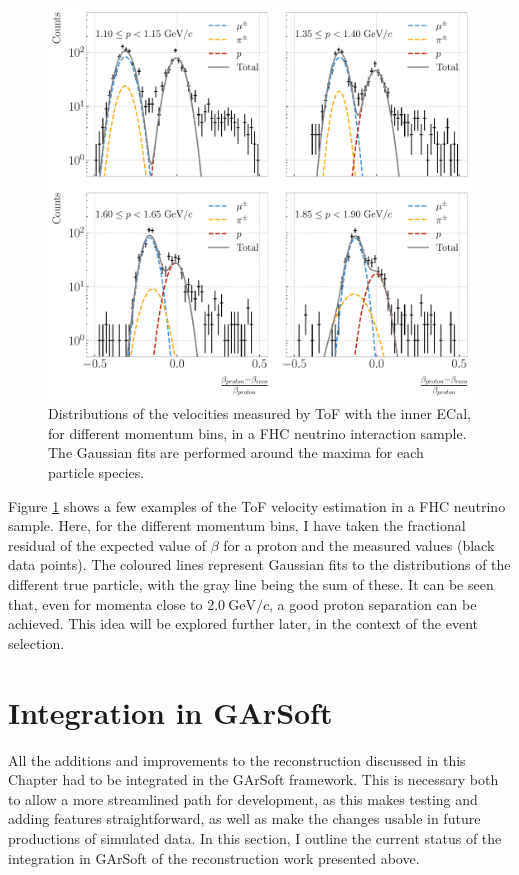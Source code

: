 \begin{figure}[t]
	\centering
	\includegraphics[width=.95\linewidth]{Images/GArSoft_PID/tof/numu_cc_proton_tof_summary.pdf}
	\caption{Distributions of the velocities measured by ToF with the
	inner ECal, for different momentum bins, in a FHC neutrino interaction sample. The Gaussian fits are performed around the maxima for each particle species.}
	\label{fig:tof_beta_fhc}
\end{figure}

Figure \ref{fig:tof_beta_fhc} shows a few examples of the ToF velocity estimation in a FHC neutrino sample. Here, for the different momentum bins, I have taken the fractional residual of the expected value of $\beta$ for a proton and the measured values (black data points). The coloured lines represent Gaussian fits to the distributions of the different true particle, with the gray line being the sum of these. It can be seen that, even for momenta close to $2.0~\mathrm{GeV}/c$, a good proton separation can be achieved. This idea will be explored further later, in the context of the event selection.

\section{Integration in GArSoft}\label{section:integration}

All the additions and improvements to the reconstruction discussed in this Chapter had to be integrated in the GArSoft framework. This is necessary both to allow a more streamlined path for development, as this makes testing and adding features straightforward, as well as make the changes usable in future productions of simulated data. In this section, I outline the current status of the integration in GArSoft of the reconstruction work presented above.

